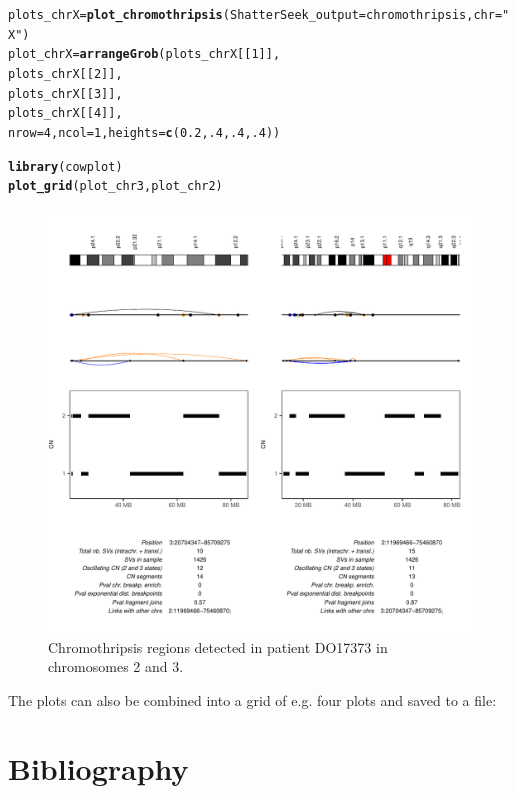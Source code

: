\documentclass[twoside,a4wide,11pt]{article}\usepackage[]{graphicx}\usepackage[]{color}
\makeatletter
\newcommand{\hlnum}[1]{\textcolor[rgb]{0.686,0.059,0.569}{#1}}%
\newcommand{\hlstr}[1]{\textcolor[rgb]{0.192,0.494,0.8}{#1}}%
\newcommand{\hlstd}[1]{\textcolor[rgb]{0.345,0.345,0.345}{#1}}%
\newcommand{\hlkwb}[1]{\textcolor[rgb]{0.69,0.353,0.396}{#1}}%
\newcommand{\hlkwc}[1]{\textcolor[rgb]{0.333,0.667,0.333}{#1}}%
\newcommand{\hlkwd}[1]{\textcolor[rgb]{0.737,0.353,0.396}{\textbf{#1}}}%
\newenvironment{kframe}{%
 \def\at@end@of@kframe{}%
 \ifinner\ifhmode%
  \def\at@end@of@kframe{\end{minipage}}%
  \begin{minipage}{\columnwidth}%
 \fi\fi%
 \def\FrameCommand##1{\hskip\@totalleftmargin \hskip-\fboxsep
 \colorbox{shadecolor}{##1}\hskip-\fboxsep
     \hskip-\linewidth \hskip-\@totalleftmargin \hskip\columnwidth}%
 \MakeFramed {\advance\hsize-\width
   \@totalleftmargin\z@ \linewidth\hsize
   \@setminipage}}%
 {\par\unskip\endMakeFramed%
 \at@end@of@kframe}
\newenvironment{knitrout}{}{} %
\makeatother
\begin{document}
\begin{knitrout}
\begin{kframe}
\begin{alltt}
\hlstd{plots_chrX} \hlkwb{=} \hlkwd{plot_chromothripsis}\hlstd{(}\hlkwc{ShatterSeek_output} \hlstd{= chromothripsis,}\hlkwc{chr} \hlstd{=} \hlstr{"X"}\hlstd{)}
\hlstd{plot_chrX} \hlkwb{=} \hlkwd{arrangeGrob}\hlstd{(plots_chrX[[}\hlnum{1}\hlstd{]],}
                        \hlstd{plots_chrX[[}\hlnum{2}\hlstd{]],}
                        \hlstd{plots_chrX[[}\hlnum{3}\hlstd{]],}
                        \hlstd{plots_chrX[[}\hlnum{4}\hlstd{]],}
                         \hlkwc{nrow}\hlstd{=}\hlnum{4}\hlstd{,}\hlkwc{ncol}\hlstd{=}\hlnum{1}\hlstd{,}\hlkwc{heights}\hlstd{=}\hlkwd{c}\hlstd{(}\hlnum{0.2}\hlstd{,}\hlnum{.4}\hlstd{,}\hlnum{.4}\hlstd{,}\hlnum{.4}\hlstd{))}

\hlkwd{library}\hlstd{(cowplot)}
\hlkwd{plot_grid}\hlstd{(plot_chr3,plot_chr2)}
\end{alltt}
\end{kframe}\begin{figure}

{\centering \includegraphics[width=0.85\linewidth,height=0.55\textheight]{figure/unnamed-chunk-10-1} 

}

\caption[Chromothripsis regions detected in patient DO17373 in chromosomes 2 and 3]{Chromothripsis regions detected in patient DO17373 in chromosomes 2 and 3.}\label{fig:unnamed-chunk-10}
\end{figure}


\end{knitrout}

The plots can also be combined into a grid of e.g. four plots and saved to a file:



\section{Bibliography}
\printbibliography
\end{document}
